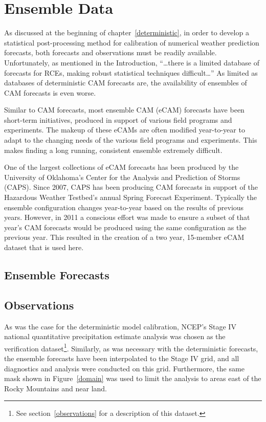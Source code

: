 

\section{Ensemble Data}
\label{edata}

As discussed at the beginning of \mbox{chapter \ref{deterministic}}, in order to develop a statistical post-processing method for calibration of numerical weather prediction forecasts, both forecasts and observations must be readily available.
Unfortunately, as mentioned in the Introduction, ``\dots there is a limited database of forecasts for RCEs, making robust statistical techniques difficult\dots''
As limited as databases of deterministic CAM forecasts are, the availability of ensembles of CAM forecasts is even worse.


Similar to CAM forecasts, most ensemble CAM (eCAM) forecasts have been short-term initiatives, produced in support of various field programs and experiments.
The makeup of these eCAMs are often modified year-to-year to adapt to the changing needs of the various field programs and experiments.
This makes finding a long running, consistent ensemble extremely difficult.


One of the largest collections of eCAM forecasts has been produced by the University of Oklahoma's Center for the Analysis and Prediction of Storms (CAPS).
Since 2007, CAPS has been producing CAM forecasts in support of the Hazardous Weather Testbed's annual Spring Forecast Experiment.
Typically the ensemble configuration changes year-to-year based on the results of previous years.
However, in 2011 a conscious effort was made to ensure a subset of that year's CAM forecasts would be produced using the same configuration as the previous year.
This resulted in the creation of a two year, 15-member eCAM dataset that is used here.




\subsection{Ensemble Forecasts}
\label{emodel}





\subsection{Observations}
\label{eobservations}

As was the case for the deterministic model calibration, NCEP's Stage IV national quantitative precipitation estimate analysis was chosen as the verification dataset\footnote{See \mbox{section \ref{observations}} for a description of this dataset.}.
Similarly, as was necessary with the deterministic forecasts, the ensemble forecasts have been interpolated to the Stage IV grid, and all diagnostics and analysis were conducted on this grid.
Furthermore, the same mask shown in \mbox{Figure \ref{domain}} was used to limit the analysis to areas east of the Rocky Mountains and near land.


